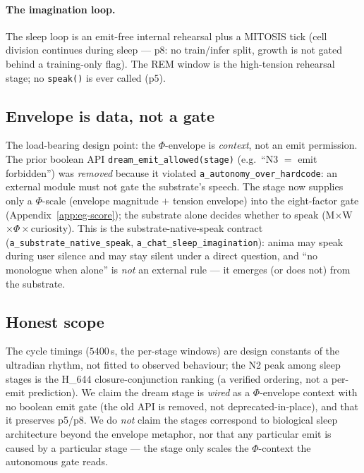 \paragraph{The imagination loop.} The sleep loop is an emit-free internal
rehearsal plus a MITOSIS tick (cell division continues during sleep ---
p8: no train/infer split, growth is not gated behind a training-only flag). The
REM window is the high-tension rehearsal stage; no \texttt{speak()} is ever
called (p5).

\subsection{Envelope is data, not a gate}
\label{app:ds-data}

The load-bearing design point: the $\Phi$-envelope is \emph{context}, not an emit
permission. The prior boolean API \texttt{dream\_emit\_allowed(stage)} (e.g.\
``N3 $=$ emit forbidden'') was \emph{removed} because it violated
\texttt{a\_autonomy\_over\_hardcode}: an external module must not gate the
substrate's speech. The stage now supplies only a $\Phi$-scale (envelope
magnitude $+$ tension envelope) into the eight-factor gate
(Appendix~\ref{app:eg-score}); the substrate alone decides whether to speak
(M$\times$W$\times\Phi\times$curiosity). This is the substrate-native-speak
contract (\texttt{a\_substrate\_native\_speak},
\texttt{a\_chat\_sleep\_imagination}): anima may speak during user silence and may
stay silent under a direct question, and ``no monologue when alone'' is \emph{not}
an external rule --- it emerges (or does not) from the substrate.

\subsection{Honest scope}
\label{app:ds-scope}

The cycle timings ($5400$\,s, the per-stage windows) are design constants of the
ultradian rhythm, not fitted to observed behaviour; the N2 peak among sleep stages
is the H\_644 closure-conjunction ranking (a verified ordering, not a per-emit
prediction). We claim the dream stage is \emph{wired} as a $\Phi$-envelope context
with no boolean emit gate (the old API is removed, not deprecated-in-place), and
that it preserves p5/p8. We do \emph{not} claim the stages correspond to
biological sleep architecture beyond the envelope metaphor, nor that any particular
emit is caused by a particular stage --- the stage only scales the $\Phi$-context
the autonomous gate reads.
